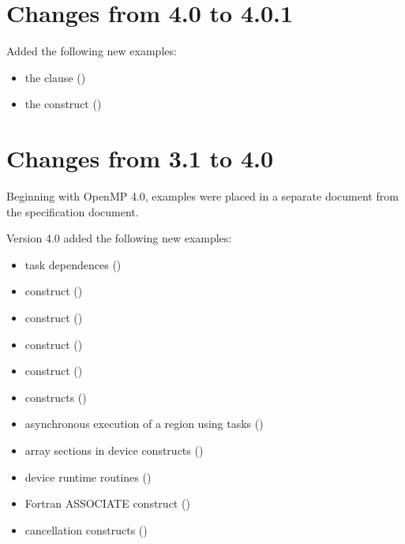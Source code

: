 \section{Changes from 4.0 to 4.0.1}

Added the following new examples:
\begin{itemize}
\item the  clause ()
\item the  construct ()
\end{itemize}

\section{Changes from 3.1 to 4.0}

Beginning with OpenMP 4.0, examples were placed in a separate document
from the specification document.

Version 4.0 added the following new examples:
\begin{itemize}
\item task dependences ()
\item {} construct ()
\item {}  construct ()
\item {}  construct ()
\item {}  construct ()
\item {} constructs ()
\item asynchronous execution of a  region using tasks
 ()
\item array sections in device constructs ()
\item device runtime routines ()
\item Fortran ASSOCIATE construct ()
\item cancellation constructs ()
\end{itemize}

